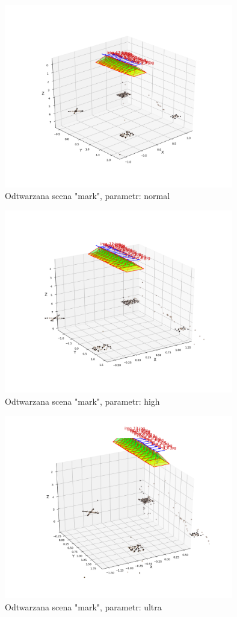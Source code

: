 \begin{figure}[h]
   \centering
   \includegraphics[width=10cm]{preset_mark/normal.png}
   \caption{Odtwarzana scena "mark", parametr: normal}
   \label {fig:preset_mark_normal}
\end{figure}
\begin{figure}[h]
   \centering
   \includegraphics[width=10cm]{preset_mark/high.png}
   \caption{Odtwarzana scena "mark", parametr: high}
   \label {fig:preset_mark_high}
\end{figure}
\begin{figure}[h]
   \centering
   \includegraphics[width=10cm]{preset_mark/ultra.png}
   \caption{Odtwarzana scena "mark", parametr: ultra}
   \label {fig:preset_mark_ultra}
\end{figure}

